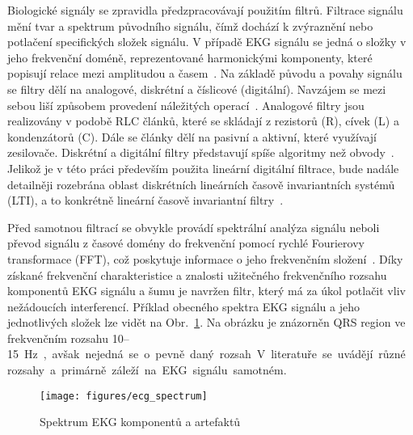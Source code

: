 Biologické signály se zpravidla předzpracovávají použitím filtrů. Filtrace
signálu mění tvar a spektrum původního signálu, čímž dochází k zvýraznění nebo
potlačení specifických složek signálu. V případě EKG signálu se jedná o složky v
jeho frekvenční doméně, reprezentované harmonickými komponenty, které popisují
relace mezi amplitudou a časem~\cite{Jan2002}. Na základě původu a povahy
signálu se filtry dělí na analogové, diskrétní a číslicové (digitální). Navzájem
se mezi sebou liší způsobem provedení náležitých operací~\cite{Skop1994}.
Analogové filtry jsou realizovány v podobě RLC článků, které se skládají z
rezistorů (R), cívek (L) a kondenzátorů (C). Dále se články dělí na pasivní a
aktivní, které využívají zesilovače. Diskrétní a digitální filtry představují
spíše algoritmy než obvody~\cite{Prchal2000}. Jelikož je v této práci především
použita lineární digitální filtrace, bude nadále detailněji rozebrána oblast
diskrétních lineárních časově invariantních systémů (LTI), a to konkrétně
lineární časově invariantní filtry~\cite{Jan2002}.

Před samotnou filtrací se obvykle provádí spektrální analýza signálu neboli
převod signálu z časové domény do frekvenční pomocí rychlé Fourierovy transformace
(FFT), což poskytuje informace o jeho frekvenčním složení~\cite{Prchal2000}.
Díky získané frekvenční charakteristice a znalosti užitečného frekvenčního
rozsahu komponentů EKG signálu a šumu je navržen filtr, který má za úkol
potlačit vliv nežádoucích interferencí. Příklad obecného spektra EKG signálu a
jeho jednotlivých složek lze vidět na Obr.~\ref{fig:ecg_spectrum}. Na obrázku je
znázorněn QRS region ve frekvenčním rozsahu 10--15~\si\Hz,~avšak nejedná se o
pevně daný rozsah. V literatuře se uvádějí různé rozsahy a primárně záleží na
EKG signálu samotném.

\begin{figure}[h]
	\begin{center}
		\texttt{[image: figures/ecg\_spectrum]}
		\caption{Spektrum EKG komponentů a artefaktů}
		\label{fig:ecg_spectrum}
	\end{center}
\end{figure}

